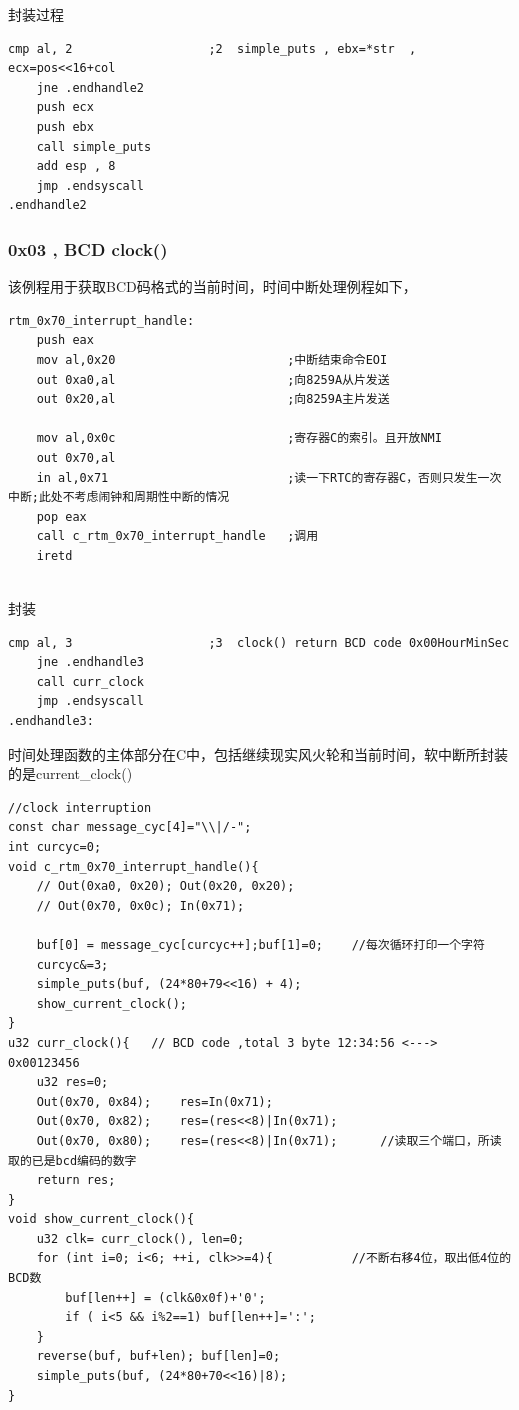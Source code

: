 \documentclass[a4paper,11pt,UTF8]{ctexart}
\begin{document}
		封装过程
			\begin{lstlisting}[language=={[x86masm]Assembler}keywordstyle=\color{blue!70},commentstyle=\color{red!50!green!50!blue!50},frame=shadowbox, rulesepcolor=\color{red!20!green!20!blue!20}]
	cmp al, 2					;2	simple_puts , ebx=*str  , ecx=pos<<16+col
	jne	.endhandle2
	push ecx
	push ebx
	call simple_puts
	add esp , 8
	jmp .endsyscall
.endhandle2
			\end{lstlisting}
			
		\subsubsection{0x03 , BCD clock()}
		该例程用于获取BCD码格式的当前时间，时间中断处理例程如下，
			\begin{lstlisting}[language=={[x86masm]Assembler}keywordstyle=\color{blue!70},commentstyle=\color{red!50!green!50!blue!50},frame=shadowbox, rulesepcolor=\color{red!20!green!20!blue!20}]
rtm_0x70_interrupt_handle:
	push eax
	mov al,0x20                        ;中断结束命令EOI
	out 0xa0,al                        ;向8259A从片发送
	out 0x20,al                        ;向8259A主片发送

	mov al,0x0c                        ;寄存器C的索引。且开放NMI
	out 0x70,al
	in al,0x71                         ;读一下RTC的寄存器C，否则只发生一次中断;此处不考虑闹钟和周期性中断的情况
	pop eax
	call c_rtm_0x70_interrupt_handle   ;调用
	iretd
		
			\end{lstlisting}
	封装
			\begin{lstlisting}[language=={[x86masm]Assembler}keywordstyle=\color{blue!70},commentstyle=\color{red!50!green!50!blue!50},frame=shadowbox, rulesepcolor=\color{red!20!green!20!blue!20}]
	cmp al, 3					;3  clock() return BCD code 0x00HourMinSec
	jne	.endhandle3
	call curr_clock
	jmp .endsyscall
.endhandle3:
			\end{lstlisting}
		时间处理函数的主体部分在C中，包括继续现实风火轮和当前时间，软中断所封装的是current\_clock()

			\begin{lstlisting}[language={[ANSI]C},keywordstyle=\color{blue!70},commentstyle=\color{red!50!green!50!blue!50},frame=shadowbox, rulesepcolor=\color{red!20!green!20!blue!20}]
//clock interruption
const char message_cyc[4]="\\|/-";
int curcyc=0;
void c_rtm_0x70_interrupt_handle(){
	// Out(0xa0, 0x20); Out(0x20, 0x20);
	// Out(0x70, 0x0c); In(0x71);

	buf[0] = message_cyc[curcyc++];buf[1]=0;  	//每次循环打印一个字符
	curcyc&=3;
	simple_puts(buf, (24*80+79<<16) + 4);
	show_current_clock();
}
u32 curr_clock(){	// BCD code ,total 3 byte 12:34:56 <---> 0x00123456
	u32 res=0;
	Out(0x70, 0x84);	res=In(0x71);
	Out(0x70, 0x82);	res=(res<<8)|In(0x71);
	Out(0x70, 0x80);	res=(res<<8)|In(0x71);		//读取三个端口，所读取的已是bcd编码的数字
	return res;
}
void show_current_clock(){ 
	u32 clk= curr_clock(), len=0;
	for (int i=0; i<6; ++i, clk>>=4){			//不断右移4位，取出低4位的BCD数
		buf[len++] = (clk&0x0f)+'0';
		if ( i<5 && i%2==1) buf[len++]=':';
	}
	reverse(buf, buf+len); buf[len]=0;
	simple_puts(buf, (24*80+70<<16)|8);
}
			\end{lstlisting} 
\end{document}
